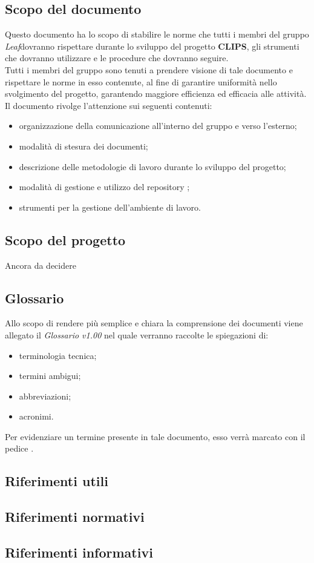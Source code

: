 \documentclass[float=false, crop=false]{standalone}
\newcommand{\leaf}{\textit{Leaf}}
\newcommand{\g}{\tiny \ped{|G|} \normalsize}
\begin{document}
	\subsection{Scopo del documento}
	Questo documento ha lo scopo di stabilire le norme che tutti i membri del gruppo \leaf dovranno rispettare durante lo sviluppo del progetto \textbf{CLIPS}, gli strumenti che dovranno utilizzare e le procedure che dovranno seguire. \\
	Tutti i membri del gruppo sono tenuti a prendere visione di tale documento e rispettare le norme in esso contenute, al fine di garantire uniformità nello svolgimento del progetto, garantendo maggiore efficienza ed efficacia alle attività. \\
	Il documento rivolge l'attenzione sui seguenti contenuti:
	\begin{itemize}
	\item organizzazione della comunicazione all'interno del gruppo e verso l'esterno;
	\item modalità di stesura dei documenti;
	\item descrizione delle metodologie di lavoro durante lo sviluppo del progetto;
	\item modalità di gestione e utilizzo del repository\g;
	\item strumenti per la gestione dell'ambiente di lavoro.
	\end{itemize}

	\subsection{Scopo del progetto}
	Ancora da decidere
	
	\subsection{Glossario}
	Allo scopo di rendere più semplice e chiara la comprensione dei documenti viene allegato il \textit{Glossario v1.00} nel quale verranno raccolte le spiegazioni di:
	\begin{itemize}
	\item terminologia tecnica;
	\item termini ambigui;
	\item abbreviazioni;
	\item acronimi.
	\end{itemize}
	Per evidenziare un termine presente in tale documento, esso verrà marcato con il pedice \g.
	
	\subsection{Riferimenti utili}

		\subsection{Riferimenti normativi}

		\subsection{Riferimenti informativi}
\end{document}
